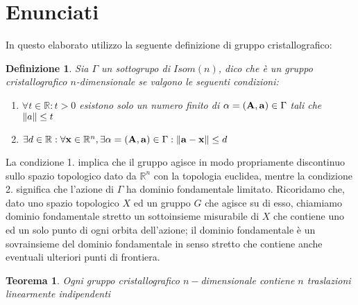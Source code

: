 \documentclass[a4paper,11pt,openright,twoside	]{book}
\newtheorem{definition}{Definizione}[section]
\newtheorem{theorem}{Teorema}[section]
\begin{document}
\section{Enunciati}
In questo elaborato utilizzo la seguente definizione di gruppo cristallografico:
\begin{definition}
Sia $\Gamma$ un sottogrupo di $Isom(n)$, dico che è un gruppo cristallografico $n$-dimensionale se valgono le seguenti condizioni:
\begin{enumerate}
	\item $ \forall t \in \mathbb{R} : t > 0 $  esistono solo un numero finito di $\alpha = \vb{(A, a)} \in \Gamma $  tali che  $\norm{a} \leq t$ 
	\item $ \exists d \in \mathbb{R}: \forall \vb{x} \in \mathbb{R}^n ,  \exists \alpha = \vb{(A,a)} \in \Gamma : \norm{\vb{a-x}}\leq d $
\end{enumerate}
\end{definition}
La condizione 1. implica che il gruppo agisce in modo propriamente discontinuo sullo spazio topologico dato da $\mathbb{R}^n$ con la topologia euclidea, mentre la condizione 2. significa che l'azione di $\Gamma$ ha dominio fondamentale limitato. Ricoridamo che, dato uno spazio topologico $X$ ed un gruppo $G$ che agisce su di esso, chiamiamo dominio fondamentale stretto un sottoinsieme misurabile di $X$ che contiene uno ed un solo punto di ogni orbita dell'azione; il dominio fondamentale è un sovrainsieme del dominio fondamentale in senso stretto che contiene anche eventuali ulteriori punti di frontiera. \\
\begin{theorem}
Ogni gruppo cristallografico $n-$dimensionale contiene $n$ traslazioni linearmente indipendenti
\end{theorem}
\newpage 
\end{document}
